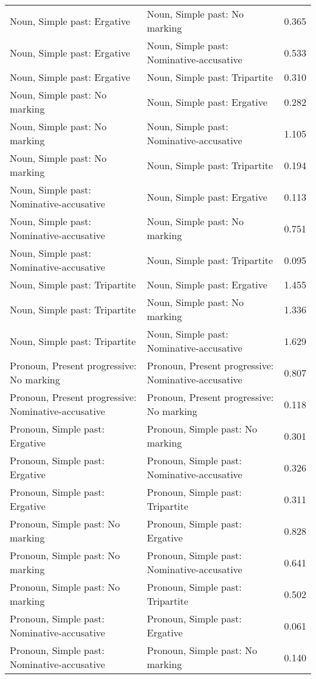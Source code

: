 \begin{longtable}{p{.4\linewidth}p{.4\linewidth}p{.1\linewidth}}
Noun, Simple past: Ergative & Noun, Simple past: No marking & 0.365\\
Noun, Simple past: Ergative & Noun, Simple past: Nominative-accusative & 0.533\\
Noun, Simple past: Ergative & Noun, Simple past: Tripartite & 0.310\\
Noun, Simple past: No marking & Noun, Simple past: Ergative & 0.282\\
Noun, Simple past: No marking & Noun, Simple past: Nominative-accusative & 1.105\\
Noun, Simple past: No marking & Noun, Simple past: Tripartite & 0.194\\
Noun, Simple past: Nominative-accusative & Noun, Simple past: Ergative & 0.113\\
Noun, Simple past: Nominative-accusative & Noun, Simple past: No marking & 0.751\\
Noun, Simple past: Nominative-accusative & Noun, Simple past: Tripartite & 0.095\\
Noun, Simple past: Tripartite & Noun, Simple past: Ergative & 1.455\\
Noun, Simple past: Tripartite & Noun, Simple past: No marking & 1.336\\
Noun, Simple past: Tripartite & Noun, Simple past: Nominative-accusative & 1.629\\
Pronoun, Present progressive: No marking & Pronoun, Present progressive: Nominative-accusative & 0.807\\
Pronoun, Present progressive: Nominative-accusative & Pronoun, Present progressive: No marking & 0.118\\
Pronoun, Simple past: Ergative & Pronoun, Simple past: No marking & 0.301\\
Pronoun, Simple past: Ergative & Pronoun, Simple past: Nominative-accusative & 0.326\\
Pronoun, Simple past: Ergative & Pronoun, Simple past: Tripartite & 0.311\\
Pronoun, Simple past: No marking & Pronoun, Simple past: Ergative & 0.828\\
Pronoun, Simple past: No marking & Pronoun, Simple past: Nominative-accusative & 0.641\\
Pronoun, Simple past: No marking & Pronoun, Simple past: Tripartite & 0.502\\
Pronoun, Simple past: Nominative-accusative & Pronoun, Simple past: Ergative & 0.061\\
Pronoun, Simple past: Nominative-accusative & Pronoun, Simple past: No marking & 0.140\\

\end{longtable}
